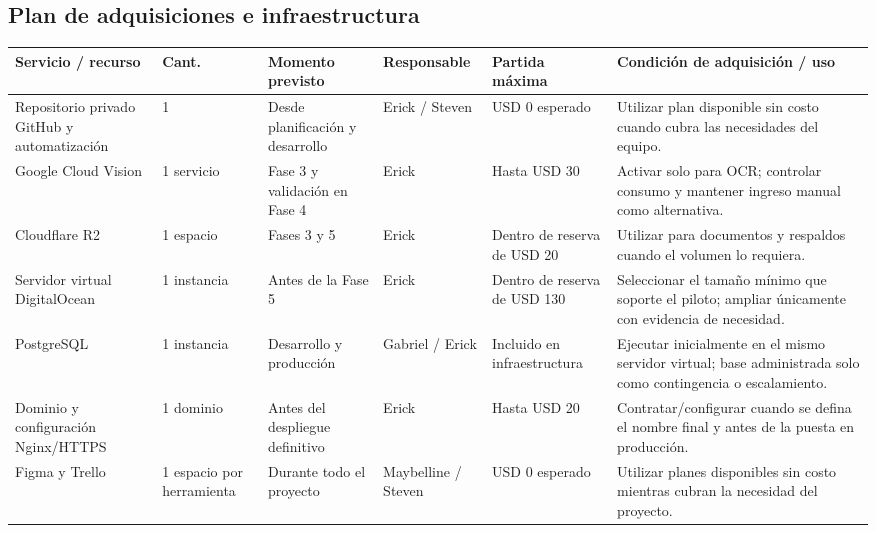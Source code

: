 \documentclass[12pt,a4paper]{article}
\begin{document}
\begin{landscape}
\subsection{Plan de adquisiciones e infraestructura}

\begin{center}
\renewcommand{\arraystretch}{1.15}
\small
\begin{tabularx}{\linewidth}{|p{4.0cm}|p{1.4cm}|p{3.4cm}|p{3.5cm}|p{2.4cm}|X|}
\hline
\rowcolor{tableheader}
\textbf{Servicio / recurso} & \textbf{Cant.} & \textbf{Momento previsto} & \textbf{Responsable} & \textbf{Partida máxima} & \textbf{Condición de adquisición / uso} \\ \hline
Repositorio privado GitHub y automatización & 1 & Desde planificación y desarrollo & Erick / Steven & USD 0 esperado & Utilizar plan disponible sin costo cuando cubra las necesidades del equipo. \\ \hline
Google Cloud Vision & 1 servicio & Fase 3 y validación en Fase 4 & Erick & Hasta USD 30 & Activar solo para OCR; controlar consumo y mantener ingreso manual como alternativa. \\ \hline
Cloudflare R2 & 1 espacio & Fases 3 y 5 & Erick & Dentro de reserva de USD 20 & Utilizar para documentos y respaldos cuando el volumen lo requiera. \\ \hline
Servidor virtual DigitalOcean & 1 instancia & Antes de la Fase 5 & Erick & Dentro de reserva de USD 130 & Seleccionar el tamaño mínimo que soporte el piloto; ampliar únicamente con evidencia de necesidad. \\ \hline
PostgreSQL & 1 instancia & Desarrollo y producción & Gabriel / Erick & Incluido en infraestructura & Ejecutar inicialmente en el mismo servidor virtual; base administrada solo como contingencia o escalamiento. \\ \hline
Dominio y configuración Nginx/HTTPS & 1 dominio & Antes del despliegue definitivo & Erick & Hasta USD 20 & Contratar/configurar cuando se defina el nombre final y antes de la puesta en producción. \\ \hline
Figma y Trello & 1 espacio por herramienta & Durante todo el proyecto & Maybelline / Steven & USD 0 esperado & Utilizar planes disponibles sin costo mientras cubran la necesidad del proyecto. \\ \hline
\end{tabularx}
\end{center}
\end{landscape}
\end{document}
